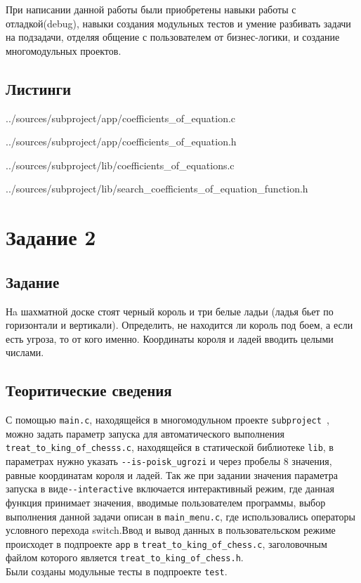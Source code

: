 \documentclass[12pt,a4paper]{report}
\begin{document}
При написании данной работы были приобретены навыки работы с отладкой(debug), навыки создания модульных тестов и умение разбивать задачи на подзадачи, отделяя общение с пользователем от бизнес-логики, и создание многомодульных проектов. 

\subsection*{Листинги}


{../sources/subproject/app/coefficients_of_equation.c}


{../sources/subproject/app/coefficients_of_equation.h}


{../sources/subproject/lib/coefficients_of_equations.c}


{../sources/subproject/lib/search_coefficients_of_equation_function.h}



\section{Задание 2}
\subsection{Задание}
Нa шахматной доске стоят черный король и три белые ладьи (ладья бьет по горизонтали и вертикали). Определить, не находится ли король под боем, а если есть угроза, то от кого именно. Координаты короля и ладей вводить целыми числами.
\subsection{Теоритические сведения}
С помощью \verb+main.c+, находящейся в многомодульном проекте \verb+subproject +, можно задать параметр запуска для автоматического выполнения\\ 
\verb+treat_to_king_of_chesss.c+, находящейся в статической библиотеке \verb+lib+, в параметрах нужно указать 
\verb+--is-poisk_ugrozi+ и через пробелы 8 значения, равные координатам короля и ладей. Так же при задании значения параметра запуска в виде\verb+--interactive+ включается интерактивный режим, где данная функция принимает значения, вводимые пользователем программы, выбор выполнения данной задачи описан в \verb+main_menu.c+, где использовались операторы условного перехода switch.Ввод и вывод данных в пользовательском режиме происходет в подпроекте \verb+app+ в 
\verb+treat_to_king_of_chess.c+, заголовочным файлом которого является \verb+treat_to_king_of_chess.h+. \\ 
Были созданы модульные тесты в подпроекте \verb+test+. 
\end{document}
